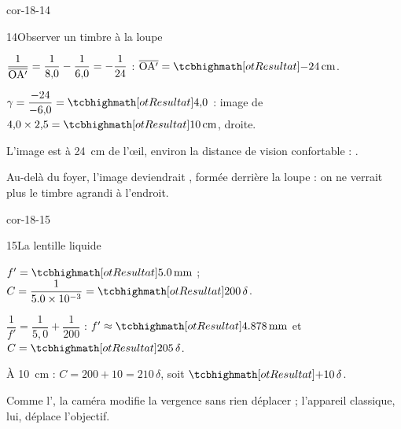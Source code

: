 \begin{blocLivre}{cor-18-14}
\begin{corrige}{14}{Observer un timbre à la loupe}
\begin{questions}
\item $\dfrac{1}{\overline{\mathrm{OA'}}}=\dfrac{1}{8{,}0}-\dfrac{1}{6{,}0}=-\dfrac{1}{24}$ : $\alg{OA'}=\res{\qty{-24}{cm}}$.
\item $\gamma=\dfrac{-24}{-6{,}0}=\res{4{,}0}$ : image de $4{,}0\times2{,}5=\res{\qty{10}{cm}}$, droite.
\item L'image est à \qty{24}{cm} de l'œil, environ la distance de vision confortable : .
\item Au-delà du foyer, l'image deviendrait , formée derrière la loupe : on ne verrait plus le timbre agrandi à l'endroit.
\end{questions}
\end{corrige}
\end{blocLivre}
\begin{blocLivre}{cor-18-15}
\begin{corrige}{15}{La lentille liquide}
\begin{questions}
\item $f'=\res{\qty{5,0}{mm}}$ ; $C=\dfrac{1}{\num{5,0e-3}}=\res{\num{200}\,\delta}$.
\item $\dfrac{1}{f'}=\dfrac{1}{5{,}0}+\dfrac{1}{200}$ : $f'\approx\res{\qty{4,878}{mm}}$ et $C=\res{\num{205}\,\delta}$.
\item À \qty{10}{cm} : $C=200+10=\num{210}\,\delta$, soit $\res{+\num{10}\,\delta}$.
\item Comme l', la caméra modifie la vergence sans rien déplacer ; l'appareil classique, lui, déplace l'objectif.
\end{questions}
\end{corrige}
\end{blocLivre}
